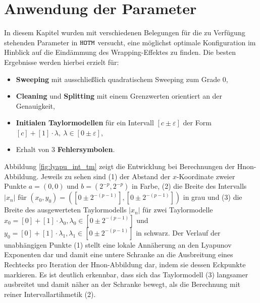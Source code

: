  \section{Anwendung der Parameter}
 In diesem Kapitel wurden mit verschiedenen Belegungen für die zu Verfügung stehenden Parameter in $\verb+HOTM+$ versucht, eine möglichst optimale Konfiguration im Hinblick auf die Eindämmung des Wrapping-Effektes zu finden. Die besten Ergebnisse werden hierbei erzielt für: 
 \begin{itemize}
  \item \textbf{Sweeping} mit ausschließlich quadratischem Sweeping zum Grade 0,
  \item \textbf{Cleaning} und \textbf{Splitting} mit einem Grenzwerten orientiert an der Genauigkeit,
  \item \textbf{Initialen Taylormodellen} für ein Intervall $[c \pm \varepsilon]$ der Form $[c] + [1] \cdot \lambda,\  \lambda \in [0 \pm \varepsilon]$,
  \item Erhalt von 3 \textbf{Fehlersymbolen}.
 \end{itemize}
Abbildung \ref{fig:lyapu_int_tm} zeigt die Entwicklung bei Berechnungen der H\e non-Abbildung. Jeweils zu sehen sind (1) der Abstand der $x$-Koordinate zweier Punkte $a=(0,0)$ und $b=(2^{-p},2^{-p})$ in Farbe, (2) die Breite des Intervalls $|x_n|$ für $(x_0, y_0)=([0\pm 2^{-(p-1)}],[0\pm 2^{-(p-1)}])$ in grau und (3) die Breite des ausgewerteten Taylormodells $|x_n|$ für zwei Taylormodelle $x_0 = [0] + [1]\cdot \lambda_0, \lambda_0\in [0\pm 2^{-(p-1)}]$ und $y_0 = [0] + [1]\cdot \lambda_1, \lambda_1\in [0\pm 2^{-(p-1)}]$ in schwarz. Der Verlauf der unabhängigen Punkte (1) stellt eine lokale Annäherung an den Lyapunov Exponenten dar und damit eine untere Schranke an die Ausbreitung eines Rechtecks pro Iteration der H\e non-Abbildung dar, indem sie dessen Eckpunkte markieren. Es ist deutlich erkennbar, dass sich das Taylormodell (3) langsamer ausbreitet und damit näher an der Schranke bewegt, als die Berechnung mit reiner Intervallartihmetik (2).
 
 
 
